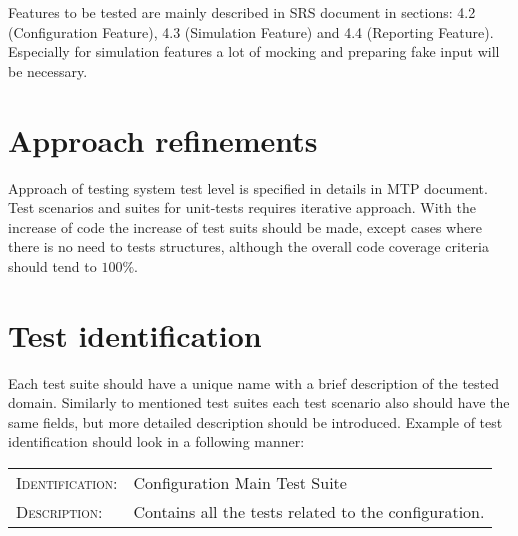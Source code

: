 	Features to be tested are mainly described in \gls{SRS} document in sections: 4.2 (Configuration Feature), 4.3 (Simulation Feature) and 4.4 (Reporting Feature). Especially for simulation features a lot of mocking and preparing fake input will be necessary.
\section{Approach refinements} \label{s:details-of-the-level-test-design:approach-refinements}
	\begin{comment}
		Specify refinements to the approach described in the corresponding Level Test Plan (if there is one;
		otherwise specify the entire approach). Include specific test techniques to be used. The method of
		analyzing test results should be identified (e.g., comparator tools, visual inspection, etc.).
		Summarize the common attributes of any test cases. This may include input constraints that must be
		true for every input in a set of associated test cases, any shared environmental needs, any shared
		special procedural requirements, and any shared case dependencies. Sets of associated test cases may
		be identified as scenarios (also commonly called scripts or suites). Test scenarios should be designed to
		be as reusable as possible for regression testing, revalidation testing for changes, and training new
		employees who must either use or support the system over time.
	\end{comment}
	Approach of testing system test level is specified in details in \gls{MTP} document. Test scenarios and suites for unit-tests requires iterative approach. With the increase of code the increase of test suits should be made, except cases where there is no need to tests structures, although the overall code coverage criteria should tend to $100\%$.
\section{Test identification} \label{s:details-of-the-level-test-design:test-identification}
	\begin{comment}
		List the identifier and a brief description of each test case (or set of related test cases) in scenarios for
		this design. A particular test case, scenario, or procedure may be identified in more than one LTD. List
		the identifier and a brief description of each procedure associated with this LTD.
	\end{comment}
	Each test suite should have a unique name with a brief description of the tested domain. Similarly to mentioned test suites each test scenario also should have the same fields, but more detailed description should be introduced. Example of test identification should look in a following manner: \\
	\begin{center}
		\boxed
		{
			\begin{tabular}{ll}
				\textsc{Identification:} & Configuration Main Test Suite \\
				\textsc{Description:} & Contains all the tests related to the configuration.
			\end{tabular}
		}
	\end{center}
